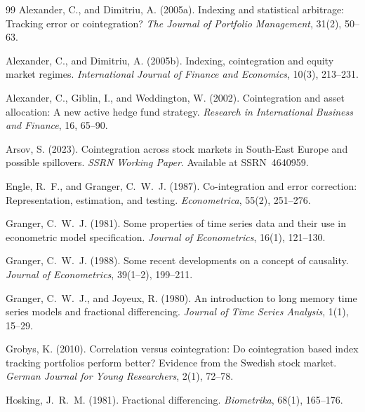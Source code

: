 \documentclass[12pt,a4paper]{article}
\begin{document}
\begin{thebibliography}{99}
Alexander, C., and Dimitriu, A. (2005a).
\newblock Indexing and statistical arbitrage: Tracking error or cointegration?
\newblock \emph{The Journal of Portfolio Management}, 31(2), 50--63.

Alexander, C., and Dimitriu, A. (2005b).
\newblock Indexing, cointegration and equity market regimes.
\newblock \emph{International Journal of Finance and Economics}, 10(3),
  213--231.

Alexander, C., Giblin, I., and Weddington, W. (2002).
\newblock Cointegration and asset allocation: A new active hedge fund strategy.
\newblock \emph{Research in International Business and Finance}, 16, 65--90.

Arsov, S. (2023).
\newblock Cointegration across stock markets in South-East Europe and possible
  spillovers.
\newblock \emph{SSRN Working Paper}. Available at SSRN~4640959.

Engle, R.~F., and Granger, C.~W.~J. (1987).
\newblock Co-integration and error correction: Representation, estimation, and
  testing.
\newblock \emph{Econometrica}, 55(2), 251--276.

Granger, C.~W.~J. (1981).
\newblock Some properties of time series data and their use in econometric
  model specification.
\newblock \emph{Journal of Econometrics}, 16(1), 121--130.

Granger, C.~W.~J. (1988).
\newblock Some recent developments on a concept of causality.
\newblock \emph{Journal of Econometrics}, 39(1--2), 199--211.

Granger, C.~W.~J., and Joyeux, R. (1980).
\newblock An introduction to long memory time series models and fractional
  differencing.
\newblock \emph{Journal of Time Series Analysis}, 1(1), 15--29.

Grobys, K. (2010).
\newblock Correlation versus cointegration: Do cointegration based index
  tracking portfolios perform better? Evidence from the Swedish stock market.
\newblock \emph{German Journal for Young Researchers}, 2(1), 72--78.

Hosking, J.~R.~M. (1981).
\newblock Fractional differencing.
\newblock \emph{Biometrika}, 68(1), 165--176.


\end{thebibliography}
\end{document}
